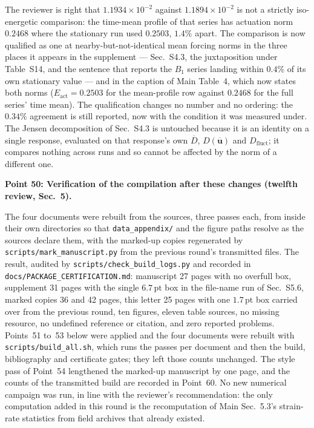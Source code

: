 \documentclass[11pt,a4paper]{article}
\begin{document}
The reviewer is right that \(1.1934\times10^{-2}\) against \(1.1894\times10^{-2}\) is not
a strictly iso-energetic comparison: the time-mean profile of that series has actuation
norm \(0.2468\) where the stationary run used \(0.2503\), \(1.4\%\) apart. The comparison
is now qualified as one at nearby-but-not-identical mean forcing norms in the three places
it appears in the supplement --- Sec.~S4.3, the juxtaposition under Table~S14, and the
sentence that reports the \(B_1\) series
landing within \(0.4\%\) of its own stationary value --- and in the caption of Main
Table~4, which now states both norms (\(E_{\mathrm{act}}=0.2503\) for the mean-profile row
against \(0.2468\) for the full series' time mean). The qualification changes no number
and no ordering: the \(0.34\%\) agreement is still reported, now with the condition it was
measured under. The Jensen decomposition of Sec.~S4.3 is untouched because it is an
identity on a single response, evaluated on that response's own \(\overline{D}\), \(D(\overline{\mathbf{u}})\)
and \(D_{\mathrm{fluct}}\); it compares nothing across runs and so cannot be affected by
the norm of a different one.

\vspace{1em}

\noindent\textbf{Point 50: Verification of the compilation after these changes
(twelfth review, Sec.~5).}

The four documents were rebuilt from the sources, three passes each, from inside their own
directories so that \texttt{data\_appendix/} and the figure paths resolve as the sources
declare them, with the marked-up copies regenerated by
\texttt{scripts/}\hspace{0pt}\texttt{mark\_manuscript.py} from the previous round's
transmitted files. The result, audited by
\texttt{scripts/}\hspace{0pt}\texttt{check\_build\_logs.py} and recorded in
\texttt{docs/}\hspace{0pt}\texttt{PACKAGE\_CERTIFICATION.md}: manuscript 27 pages with no
overfull box, supplement 31 pages with the single \(6.7\,\mathrm{pt}\) box in the file-name
run of Sec.~S5.6, marked copies 36 and 42 pages, this letter 25 pages with one
\(1.7\,\mathrm{pt}\) box carried over from the previous round, ten figures, eleven table
sources, no missing resource, no undefined reference or citation, and zero reported
problems. Points~51 to~53 below were applied and the four documents were rebuilt with
\texttt{scripts/}\hspace{0pt}\texttt{build\_all.sh}, which runs the passes per
document and then the build, bibliography and certificate gates; they left those counts
unchanged. The style pass of Point~54 lengthened the marked-up manuscript by one page,
and the counts of the transmitted build are recorded in Point~60. No new
numerical campaign was run, in line with the reviewer's recommendation: the only
computation added in this round is the recomputation of Main Sec.~5.3's strain-rate
statistics from field archives that already existed.
\end{document}
